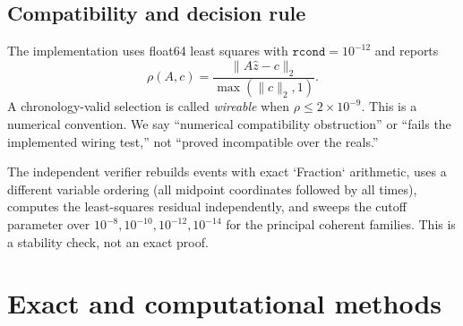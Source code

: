 \documentclass[11pt]{article}
\theoremstyle{definition}
\theoremstyle{remark}
\newcommand{\norm}[1]{\lVert#1\rVert}
\newcommand{\rhores}{\rho}
\begin{document}
\subsection{Compatibility and decision rule}
The implementation uses float64 least squares with $\texttt{rcond}=10^{-12}$ and reports
\[
 \rhores(A,c)=\frac{\norm{A\widehat z-c}_2}{\max(\norm{c}_2,1)}. \tag{3}
\]
A chronology-valid selection is called \emph{wireable} when $\rhores\le2\times10^{-9}$. This is a numerical convention. We say ``numerical compatibility obstruction'' or ``fails the implemented wiring test,'' not ``proved incompatible over the reals.''

The independent verifier rebuilds events with exact `Fraction` arithmetic, uses a different variable ordering (all midpoint coordinates followed by all times), computes the least-squares residual independently, and sweeps the cutoff parameter over $10^{-8},10^{-10},10^{-12},10^{-14}$ for the principal coherent families. This is a stability check, not an exact proof.

\section{Exact and computational methods}
\end{document}
